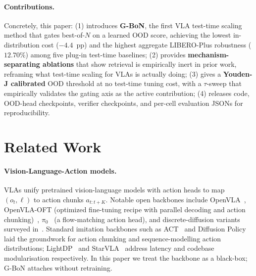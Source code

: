 \documentclass{article}
\begin{document}
\paragraph{Contributions.}
Concretely, this paper:
(1) introduces \textbf{G-BoN}, the first VLA test-time scaling method
that gates best-of-$N$ on a learned OOD score, achieving the lowest
in-distribution cost ($-4.4$~pp) and the highest aggregate LIBERO-Plus
robustness ($12.70\%$) among five plug-in test-time baselines;
(2) provides \textbf{mechanism-separating ablations} that show
retrieval is empirically inert in prior work, reframing what test-time
scaling for VLAs is actually doing;
(3) gives a \textbf{Youden-J calibrated} OOD threshold at no
test-time tuning cost, with a $\tau$-sweep that empirically validates
the gating axis as the active contribution;
(4) releases code, OOD-head checkpoints, verifier checkpoints, and
per-cell evaluation JSONs for reproducibility.

\section{Related Work}
\label{sec:related}

\paragraph{Vision-Language-Action models.}
VLAs unify pretrained vision-language models with action heads to map
$(o_t, \ell)$ to action chunks $a_{t:t+K}$. Notable open backbones
include OpenVLA~\citep{kim2024openvla}, OpenVLA-OFT
(optimized fine-tuning recipe with parallel decoding and action
chunking)~\citep{kim2025openvlaoft}, $\pi_0$~\citep{pi02024} (a
flow-matching action head), and discrete-diffusion variants surveyed
in~\citep{discrete_diffusion_vla2026}. Standard imitation backbones
such as ACT~\citep{zhao2023ACT} and Diffusion
Policy~\citep{chi2023diffusion} laid the groundwork for action chunking
and sequence-modelling action distributions; LightDP~\citep{lightdp2025}
and StarVLA~\citep{starvla2026} address latency and codebase
modularisation respectively. In this paper we treat the backbone as a
black-box; G-BoN attaches without retraining.
\end{document}
